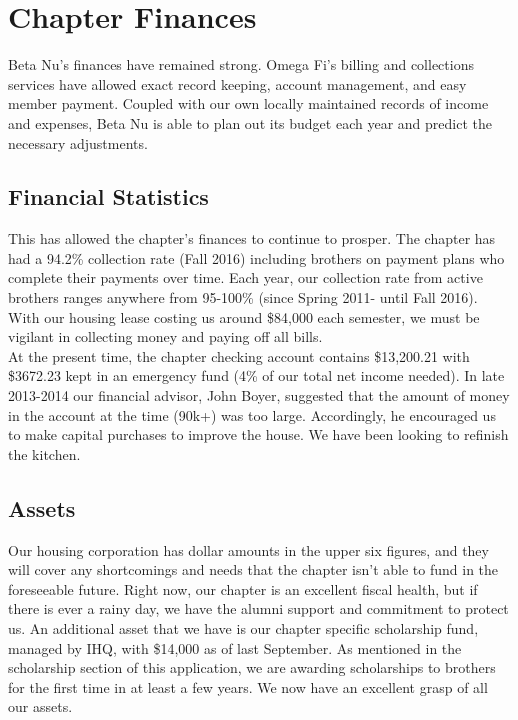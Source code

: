 \chapter{Chapter Finances}

  Beta Nu's finances have remained strong. Omega Fi's billing and collections services have allowed exact record keeping, account management, and easy member payment. Coupled with our own locally maintained records of income and expenses, Beta Nu is able to plan out its budget each year and predict the necessary adjustments.

  \section*{Financial Statistics}
    This has allowed the chapter's finances to continue to prosper. The chapter has had a 94.2\% collection rate (Fall 2016) including brothers on payment plans who complete their payments over time. Each year, our collection rate from active brothers ranges anywhere from 95-100\% (since Spring 2011- until Fall 2016). With our housing lease costing us around \$84,000 each semester, we must be vigilant in collecting money and paying off all bills. \\

    At the present time, the chapter checking account contains \$13,200.21 with \$3672.23 kept in an emergency fund (4\% of our total net income needed). In late 2013-2014 our financial advisor, John Boyer, suggested that the amount of money in the account at the time (90k+) was too large. Accordingly, he encouraged us to make capital purchases to improve the house. We have been looking to refinish the kitchen.
    
  \section*{Assets}
    Our housing corporation has dollar amounts in the upper six figures, and they will cover any shortcomings and needs that the chapter isn't able to fund in the foreseeable future. Right now, our chapter is an excellent fiscal health, but if there is ever a rainy day, we have the alumni support and commitment to protect us. An additional asset that we have is our chapter specific scholarship fund, managed by IHQ, with \$14,000 as of last September. As mentioned in the scholarship section of this application, we are awarding scholarships to brothers for the first time in at least a few years. We now have an excellent grasp of all our assets.
    
